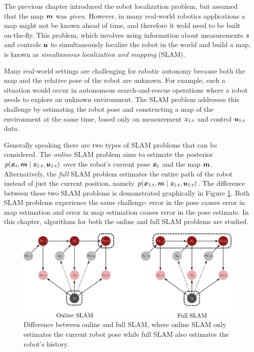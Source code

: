 The previous chapter introduced the robot localization problem, but assumed that the map $\bm{m}$ was \textit{given}. However, in many real-world robotics applications a map might not be known ahead of time, and therefore it wold need to be built on-the-fly. This problem, which involves using information about measurements $\bm{z}$ and controls $\bm{u}$ to simultaneously localize the robot in the world and build a map, is known as \textit{simultaneous localization and mapping} (SLAM)\cite{ThrunBurgardEtAl2005}.

Many real-world settings are challenging for robotic autonomy because both the map and the relative pose of the robot are unknown. For example, such a situation would occur in autonomous search-and-rescue operations where a robot needs to explore an unknown environment. The SLAM problem addresses this challenge by estimating the robot pose and constructing a map of the environment at the same time, based only on measurement $\bm{z}_{1:t}$ and control $\bm{u}_{1:t}$ data.

Generally speaking there are two types of SLAM problems that can be considered. The \textit{online} SLAM problem aims to estimate the posterior $p(\bm{x}_t, \bm{m}\mid \bm{z}_{1:t}, \bm{u}_{1:t})$ over the robot's current pose $\bm{x}_t$ and the map $\bm{m}$. Alternatively, the \textit{full} SLAM problem estimates the entire path of the robot instead of just the current position, namely $p(\bm{x}_{1:t}, \bm{m}\mid \bm{z}_{1:t}, \bm{u}_{1:t})$. The difference between these two SLAM problems is demonstrated graphically in Figure \ref{fig:online_full_slam}. Both SLAM problems experience the same challenge: error in the pose causes error in map estimation and error in map estimation causes error in the pose estimate. In this chapter, algorithms for both the online and full SLAM problems are studied.
\begin{figure}[ht]
    \centering
    \includegraphics[width=.75\textwidth]{tex/figs/ch17_figs/online_full_slam.png}
    \caption{Difference between online and full SLAM, where online SLAM only estimates the current robot pose while full SLAM also estimates the robot's history.}
    \label{fig:online_full_slam}
\end{figure}



